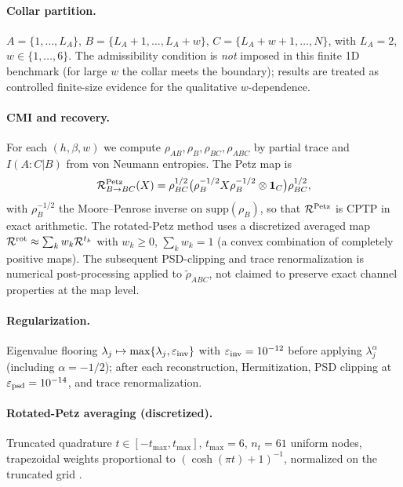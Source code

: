 \documentclass[11pt]{article}
\begin{document}
\paragraph{Collar partition.}
$A = \{1,\dots,L_A\}$, $B = \{L_A{+}1,\dots,L_A{+}w\}$,
$C = \{L_A{+}w{+}1,\dots,N\}$, with $L_A = 2$, $w \in \{1,\dots,6\}$.
The admissibility condition is \emph{not} imposed in this finite 1D benchmark
(for large $w$ the collar meets the boundary); results are treated as
controlled finite-size evidence for the qualitative $w$-dependence.

\paragraph{CMI and recovery.}
For each $(h,\beta,w)$ we compute $\rho_{AB}, \rho_B, \rho_{BC}, \rho_{ABC}$
by partial trace and $I(A:C|B)$ from von Neumann entropies. The Petz map is
\begin{equation}
\mathcal{R}^{\rm Petz}_{B\to BC}(X)
= \rho_{BC}^{1/2}\bigl(\rho_B^{-1/2} X \rho_B^{-1/2} \otimes \mathbf{1}_C\bigr)
\rho_{BC}^{1/2},
\end{equation}
with $\rho_B^{-1/2}$ the Moore--Penrose inverse on $\mathrm{supp}(\rho_B)$, so
that $\mathcal{R}^{\rm Petz}$ is CPTP in exact arithmetic. The rotated-Petz
method uses a discretized averaged map
$\mathcal{R}^{\rm rot} \approx \sum_k w_k \mathcal{R}^{t_k}$ with $w_k \ge 0$,
$\sum_k w_k = 1$ (a convex combination of completely positive maps). The
subsequent PSD-clipping and trace renormalization is numerical post-processing
applied to $\tilde\rho_{ABC}$, not claimed to preserve exact channel
properties at the map level.

\paragraph{Regularization.}
Eigenvalue flooring $\lambda_j \mapsto \max\{\lambda_j, \varepsilon_{\rm inv}\}$
with $\varepsilon_{\rm inv} = 10^{-12}$ before applying $\lambda_j^\alpha$
(including $\alpha = -1/2$); after each reconstruction, Hermitization, PSD
clipping at $\varepsilon_{\rm psd} = 10^{-14}$, and trace renormalization.

\paragraph{Rotated-Petz averaging (discretized).}
Truncated quadrature $t \in [-t_{\max}, t_{\max}]$, $t_{\max} = 6$, $n_t = 61$
uniform nodes, trapezoidal weights proportional to $(\cosh(\pi t)+1)^{-1}$,
normalized on the truncated grid \cite{JRSWW}.
\end{document}
